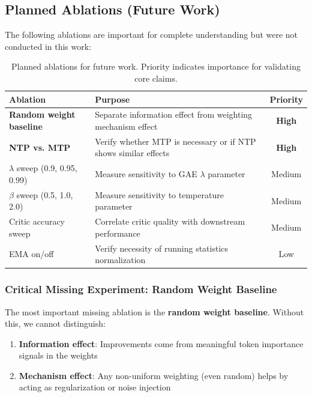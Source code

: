 \subsection{Planned Ablations (Future Work)}

The following ablations are important for complete understanding but were not conducted in this work:

\begin{table}[h]
\centering
\caption{Planned ablations for future work. Priority indicates importance for validating core claims.}
\label{tab:future_ablations}
\begin{tabular}{lp{7cm}c}
\toprule
\textbf{Ablation} & \textbf{Purpose} & \textbf{Priority} \\
\midrule
\textbf{Random weight baseline} & Separate information effect from weighting mechanism effect & \textbf{High} \\
\textbf{NTP vs. MTP} & Verify whether MTP is necessary or if NTP shows similar effects & \textbf{High} \\
$\lambda$ sweep (0.9, 0.95, 0.99) & Measure sensitivity to GAE $\lambda$ parameter & Medium \\
$\beta$ sweep (0.5, 1.0, 2.0) & Measure sensitivity to temperature parameter & Medium \\
Critic accuracy sweep & Correlate critic quality with downstream performance & Medium \\
EMA on/off & Verify necessity of running statistics normalization & Low \\
\bottomrule
\end{tabular}
\end{table}

\subsubsection{Critical Missing Experiment: Random Weight Baseline}

The most important missing ablation is the \textbf{random weight baseline}. Without this, we cannot distinguish:

\begin{enumerate}[nosep]
    \item \textbf{Information effect}: Improvements come from meaningful token importance signals in the weights
    \item \textbf{Mechanism effect}: Any non-uniform weighting (even random) helps by acting as regularization or noise injection
\end{enumerate}

